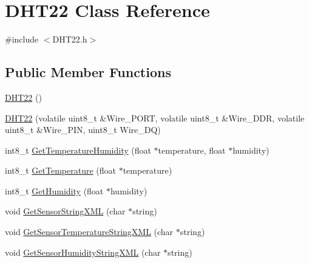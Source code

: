 \hypertarget{classDHT22}{}\section{D\+H\+T22 Class Reference}
\label{classDHT22}


{\ttfamily \#include $<$D\+H\+T22.\+h$>$}

\subsection*{Public Member Functions}
\begin{DoxyCompactItemize}
\item 
\hyperlink{classDHT22_ad80f0ddc323aa1ec6702230d4a80349f}{D\+H\+T22} ()
\item 
\hyperlink{classDHT22_a266c5c8555486bb830dc4668cd1875d4}{D\+H\+T22} (volatile uint8\+\_\+t \&Wire\+\_\+\+P\+O\+RT, volatile uint8\+\_\+t \&Wire\+\_\+\+D\+DR, volatile uint8\+\_\+t \&Wire\+\_\+\+P\+IN, uint8\+\_\+t Wire\+\_\+\+DQ)
\item 
int8\+\_\+t \hyperlink{classDHT22_a51552e5b7373329a6751aeffc04a8fd5}{Get\+Temperature\+Humidity} (float $\ast$temperature, float $\ast$humidity)
\item 
int8\+\_\+t \hyperlink{classDHT22_abe301571f40deb569b74e980ef2da9a7}{Get\+Temperature} (float $\ast$temperature)
\item 
int8\+\_\+t \hyperlink{classDHT22_acaffb8b6e2602a291d3b2e2ec5bc340c}{Get\+Humidity} (float $\ast$humidity)
\item 
void \hyperlink{classDHT22_ac3f4e0757e14c5a8ea96cd4eb5e8d57c}{Get\+Sensor\+String\+X\+ML} (char $\ast$string)
\item 
void \hyperlink{classDHT22_a7384e5b3512bca9692932cbc74c0d110}{Get\+Sensor\+Temperature\+String\+X\+ML} (char $\ast$string)
\item 
void \hyperlink{classDHT22_acee19cfc832183328130ec99ce0f9854}{Get\+Sensor\+Humidity\+String\+X\+ML} (char $\ast$string)
\end{DoxyCompactItemize}
